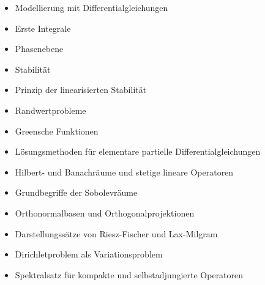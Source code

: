 \begin{course}
\begin{content}
\begin{itemize}\item Modellierung mit Differentialgleichungen  \item Erste Integrale  \item Phasenebene  \item Stabilität  \item Prinzip der linearisierten Stabilität  \item Randwertprobleme  \item Greensche Funktionen  \item Lösungsmethoden für elementare partielle Differentialgleichungen  \item Hilbert- und Banachräume und stetige lineare Operatoren  \item Grundbegriffe der Sobolevräume  \item Orthonormalbasen und Orthogonalprojektionen  \item Darstellungssätze von Riesz-Fischer und Lax-Milgram  \item Dirichletproblem als Variationsproblem  \item Spektralsatz für kompakte und selbstadjungierte Operatoren  \end{itemize}
\end{content}







\end{course}